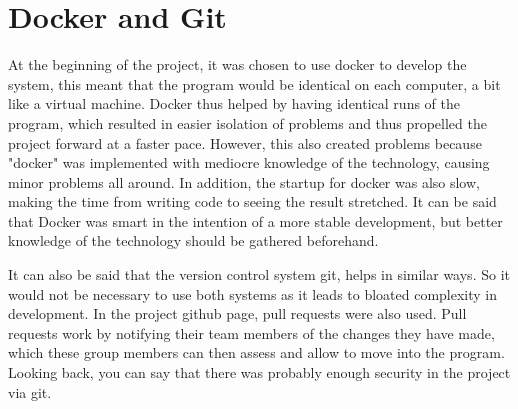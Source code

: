 \section{Docker and Git}
At the beginning of the project, it was chosen to use docker to develop the system, this meant that the program would be identical on each computer, a bit like a virtual machine.
Docker thus helped by having identical runs of the program, which resulted in easier isolation of problems and thus propelled the project forward at a faster pace.
However, this also created problems because "docker" was implemented with mediocre knowledge of the technology, causing minor problems all around.
In addition, the startup for docker was also slow, making the time from writing code to seeing the result stretched.
It can be said that Docker was smart in the intention of a more stable development, but better knowledge of the technology should be gathered beforehand.

It can also be said that the version control system git, helps in similar ways.
So it would not be necessary to use both systems as it leads to bloated complexity in development.
In the project github page, pull requests were also used.
Pull requests work by notifying their team members of the changes they have made, which these group members can then assess and allow to move into the program.
Looking back, you can say that there was probably enough security in the project via git.
